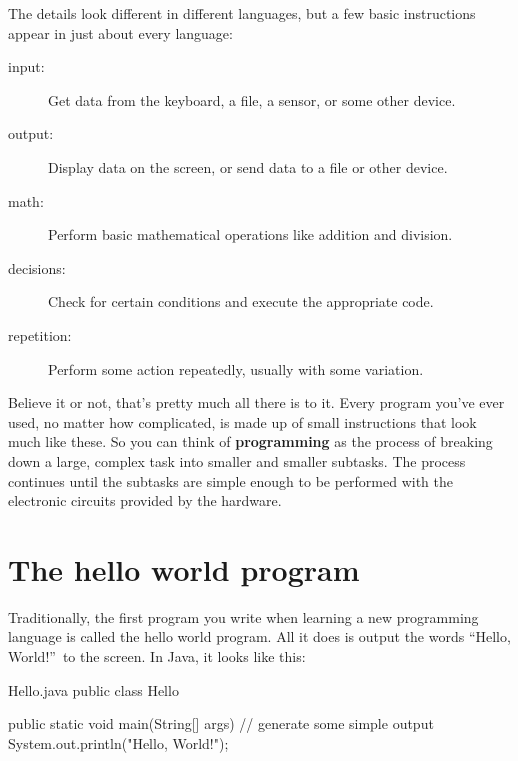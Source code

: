 The details look different in different languages, but a few basic instructions appear in just about every language:

\begin{description}
\item[input:] Get data from the keyboard, a file, a sensor, or some other device.
\item[output:] Display data on the screen, or send data to a file or other device.
\item[math:] Perform basic mathematical operations like addition and division.
\item[decisions:] Check for certain conditions and execute the appropriate code.
\item[repetition:] Perform some action repeatedly, usually with some variation.
\end{description}


Believe it or not, that's pretty much all there is to it.
Every program you've ever used, no matter how complicated, is made up of small instructions that look much like these.
So you can think of {\bf programming} as the process of breaking down a large, complex task into smaller and smaller subtasks.
The process continues until the subtasks are simple enough to be performed with the electronic circuits provided by the hardware.


\section{The hello world program}
\label{hello}

Traditionally, the first program you write when learning a new programming language is called the hello world program.
All it does is output the words ``Hello, World!''\ to the screen.
In Java, it looks like this:



\begin{trinket}[235]{Hello.java}
public class Hello {

    public static void main(String[] args) {
        // generate some simple output
        System.out.println("Hello, World!");
    }
}
\end{trinket}

